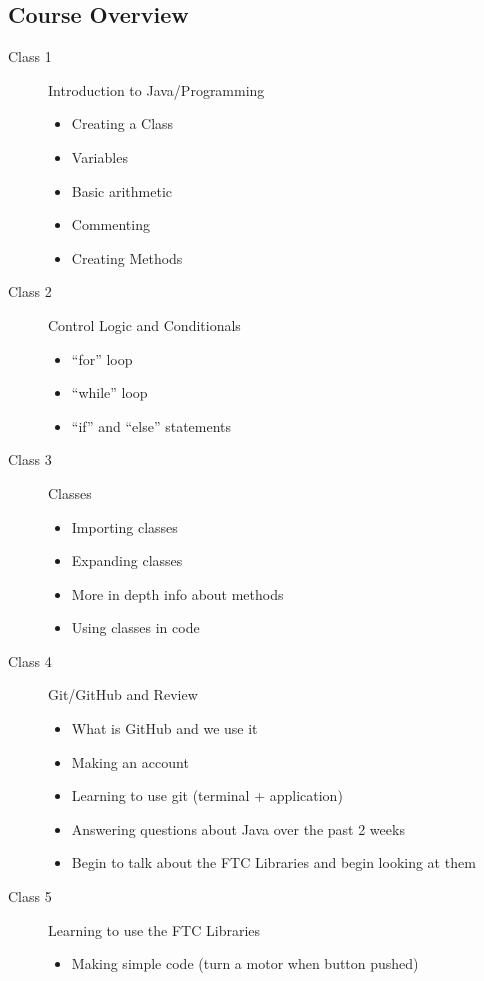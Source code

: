\documentclass[11pt,fleqn]{article}
\theoremstyle{definition}
\begin{document}
\begin{center}
\section*{Course Overview}
\end{center}

\begin{description}
\item[Class 1] Introduction to Java/Programming
\begin{itemize}
\item Creating a Class
\item Variables
\item Basic arithmetic
\item Commenting
\item Creating Methods
\end{itemize}

\item[Class 2] Control Logic and Conditionals
\begin{itemize}
\item ``for'' loop
\item ``while'' loop
\item ``if'' and ``else'' statements
\end{itemize}

\item[Class 3] Classes
\begin{itemize}
\item Importing classes
\item Expanding classes
\item More in depth info about methods
\item Using classes in code
\end{itemize}

\item[Class 4] Git/GitHub and Review
\begin{itemize}
\item What is GitHub and we use it
\item Making an account
\item Learning to use git (terminal + application)
\item Answering questions about Java over the past 2 weeks
\item Begin to talk about the FTC Libraries and begin looking at them
\end{itemize}

\item[Class 5] Learning to use the FTC Libraries
\begin{itemize}
\item Making simple code (turn a motor when button pushed)
\end{itemize}


\end{description}
\end{document}
